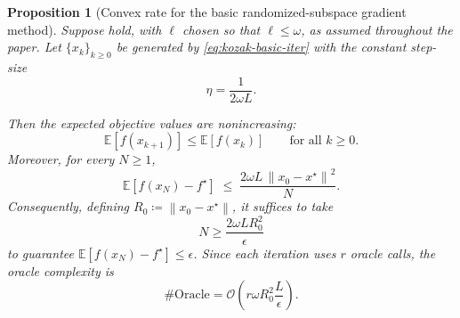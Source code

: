 \documentclass[10pt]{article}
\newtheorem{proposition}[proposition]{Proposition}
\newcommand{\E}{\mathbb{E}}
\newcommand{\norm}[1]{\left\|#1\right\|}
\begin{document}
\begin{proposition}[Convex rate for the basic randomized-subspace gradient method]
\label{prop:kozak-convex}
Suppose
 hold,
with \(\ell\) chosen so that \(\ell\le\omega\), as assumed throughout the paper.
Let \(\{x_k\}_{k\ge0}\) be generated by
\eqref{eq:kozak-basic-iter} with the constant step-size
\[
\eta=\frac{1}{2\omega L}.
\]

Then the expected objective values are nonincreasing:
\[
\E[f(x_{k+1})]\le \E[f(x_k)]
\qquad\text{for all }k\ge 0.
\]
Moreover, for every \(N\ge 1\),
\begin{equation}
\E[f(x_N)-f^\star]
\;\le\;
\frac{2\omega L\,\norm{x_0-x^\star}^2}{N}.
\label{eq:kozak-convex-rate}
\end{equation}
Consequently, defining \(R_0\coloneqq \norm{x_0-x^\star}\), it suffices to take
\[
N\ge \frac{2\omega L R_0^2}{\epsilon}
\]
to guarantee \(\E[f(x_N)-f^\star]\le \epsilon\). Since each iteration uses
\(r\) oracle calls, the oracle complexity is
\begin{equation}
\#\mathrm{Oracle}
=
\mathcal{O}\!\left(
r\omega R_0^2 \frac{L}{\epsilon}
\right).
\label{eq:kozak-convex-oracle}
\end{equation}
\end{proposition}
\end{document}
